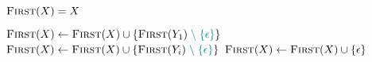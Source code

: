 
\begin{algorithm}[H]
\begin{algorithmic}[1]
      
      \State $\first(X) = X$
    \EndIf

    \hStatex
     
      \State $\first(X) \gets \first(X) \cup \set{\first(Y_{1}) \;\teal{\setminus\; \set{\epsilon}}}$
            \State $\first(X) \gets \first(X) \cup \set{\first(Y_{i}) \;\teal{\setminus\; \set{\epsilon}}}$
          \EndIf
      \EndFor
       
        \State $\first(X) \gets \first(X) \cup \set{\epsilon}$
      \EndIf
    \EndFor
  \EndProcedure
\end{algorithmic}
\end{algorithm}